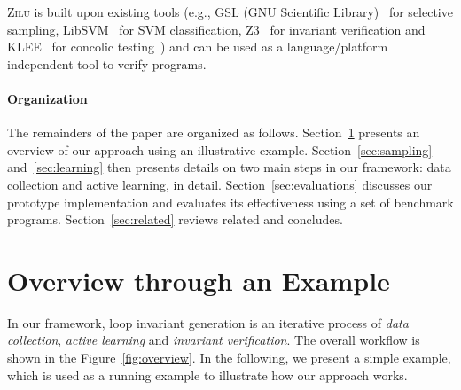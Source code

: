     \textsc{Zilu} is built upon existing tools (e.g., GSL (GNU Scientific Library)~\cite{gough2009gnu} for selective sampling,
    LibSVM~\cite{chang2011libsvm} for SVM classification,
    Z3~\cite{de2008z3} for invariant verification
    and KLEE~\cite{cadar2008klee} for concolic testing~\cite{sen2007concolic}) and can be used as a language/platform independent tool to verify programs.

\paragraph{Organization} The remainders of the paper are organized as follows. Section~\ref{sec:overview} presents an overview of our approach using an illustrative example. Section~\ref{sec:sampling} and~\ref{sec:learning} then presents details on two main steps in our framework: data collection and active learning, in detail. Section~\ref{sec:evaluations} discusses our prototype implementation and evaluates its effectiveness using a set of benchmark programs. Section~\ref{sec:related} reviews related and concludes.

\section{Overview through an Example} \label{sec:overview}
In our framework, loop invariant generation is an iterative process of \emph{data collection}, \emph{active learning} and \emph{invariant verification}. The overall workflow is shown in the Figure~\ref{fig:overview}. In the following, we present a simple example, which is used as a running example to illustrate how our approach works.

